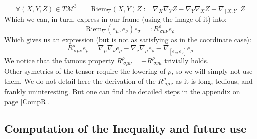\documentclass[a4paper,11pt]{article}
\numberwithin{equation}{section}
\theoremstyle{definition}
\begin{document}
\begin{equation}
    \forall (X,Y,Z)\in T\mathcal{M}^3 \quad \quad \mathrm{Riem}_\nabla (X,Y)Z:= \nabla_X\nabla_YZ-\nabla_Y\nabla_XZ-\nabla_{[X,Y]}Z
\end{equation}
Which we can, in turn, express in our frame (using the image of it) into:
$$
\mathrm{Riem}_\nabla (e_\mu,e_\nu)e_\sigma =: R^\rho_{\;\sigma\mu\nu} e_\rho
$$
Which gives us an expression (but is not as satisfying as in the coordinate case):
\begin{equation}
    R^\rho_{\;\sigma\mu\nu} e_\rho = \nabla_\mu\nabla_\nu e_\rho-\nabla_\nu\nabla_\mu e_\rho-\nabla_{[e_\mu,e_\nu]}e_\rho
\end{equation}
We notice that the famous property $R^\rho_{\;\sigma\mu\nu}=-R^\rho_{\;\sigma\nu\mu}$ trivially holds.\\
Other symetries of the tensor require the lowering of $\rho$, so we will simply not use them. We do not detail here the derivation of the $R^\rho_{\;\sigma\mu\nu}$ as it is long, tedious, and frankly uninteresting. But one can find the detailed steps in the appendix on page \ref{CompR}.
\subsection{Computation of the Inequality and future use}
\end{document}
